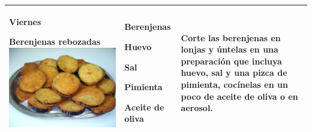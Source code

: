 \documentclass[menu.tex]{subfiles}
\begin{document}
\begin{tabular} {p{3.5cm} p{4cm} p{9cm}}
\pbox{20cm}
{
\rule{0pt}{3ex}\begin{large}\textbf{Viernes}\end{large}\\
\rule{0pt}{2ex}Berenjenas rebozadas\\
\includegraphics[scale=0.13]{berenjenas_rebozadas}
} & 
\vspace{-1.8cm}
\begin{compactitem} 
\begin{footnotesize}
\item Berenjenas
\item Huevo
\item Sal
\item Pimienta
\item Aceite de oliva
\end{footnotesize}
\end{compactitem}&
\vspace{-1.8cm}
Corte las berenjenas en lonjas y úntelas en una preparación que incluya huevo, sal y una pizca de pimienta, cocínelas en un poco de aceite de oliva o en aerosol.\\
\hline


\end{tabular}
\end{document}
